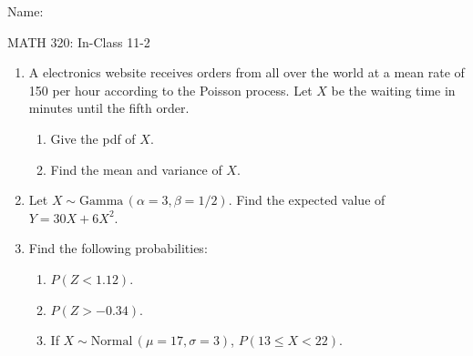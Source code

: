 \documentclass{article}
\newcommand{\follow}[1]{\sim \text{#1}\,}		%
\begin{document}
\hspace{375pt}Name:

\begin{center}
{\Huge MATH 320: In-Class 11-2}

\end{center}
\bigskip\bigskip


\begin{enumerate}

    \item A electronics website receives orders from all over the world at a mean rate of 150 per hour according to the Poisson process. Let $X$ be the waiting time in minutes until the fifth order.%
    \begin{enumerate}
        \item Give the pdf of $X$.\vspace{40pt}
        \item Find the mean and variance of $X$.\vspace{40pt}
    \end{enumerate}

    \item Let $X \follow{Gamma}(\alpha = 3, \beta = 1/2)$. Find the expected value of $Y = 30X + 6X^2$.\vspace{100pt}%

    \item Find the following probabilities:%
    \begin{enumerate}
        \item $P(Z < 1.12)$.\vspace{80pt}
        \item $P(Z > -0.34)$.\vspace{80pt}
        \item If $X \sim \text{Normal}\,(\mu = 17, \sigma = 3)$, $P(13 \le X < 22)$.\vspace{80pt}
    \end{enumerate}
    
    \newpage
    

\end{enumerate}
\end{document}
